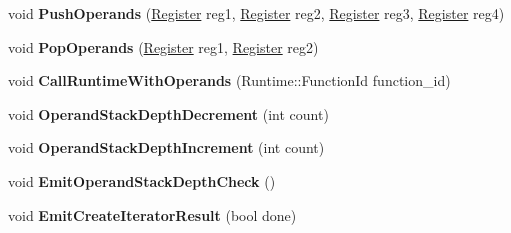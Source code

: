 \begin{DoxyCompactItemize}
\item 
void {\bfseries Push\+Operands} (\hyperlink{structv8_1_1internal_1_1_register}{Register} reg1, \hyperlink{structv8_1_1internal_1_1_register}{Register} reg2, \hyperlink{structv8_1_1internal_1_1_register}{Register} reg3, \hyperlink{structv8_1_1internal_1_1_register}{Register} reg4)\hypertarget{classv8_1_1internal_1_1_full_code_generator_a3cf7e616a0ec471e23ce2690f53fc79c}{}\label{classv8_1_1internal_1_1_full_code_generator_a3cf7e616a0ec471e23ce2690f53fc79c}

\item 
void {\bfseries Pop\+Operands} (\hyperlink{structv8_1_1internal_1_1_register}{Register} reg1, \hyperlink{structv8_1_1internal_1_1_register}{Register} reg2)\hypertarget{classv8_1_1internal_1_1_full_code_generator_ae6779ab4d33886053590c520f7411d66}{}\label{classv8_1_1internal_1_1_full_code_generator_ae6779ab4d33886053590c520f7411d66}

\item 
void {\bfseries Call\+Runtime\+With\+Operands} (Runtime\+::\+Function\+Id function\+\_\+id)\hypertarget{classv8_1_1internal_1_1_full_code_generator_a37a249ad60ca6c20501c6dfc11d990fd}{}\label{classv8_1_1internal_1_1_full_code_generator_a37a249ad60ca6c20501c6dfc11d990fd}

\item 
void {\bfseries Operand\+Stack\+Depth\+Decrement} (int count)\hypertarget{classv8_1_1internal_1_1_full_code_generator_a5388e99be188326b4bb37d6ffa8061d2}{}\label{classv8_1_1internal_1_1_full_code_generator_a5388e99be188326b4bb37d6ffa8061d2}

\item 
void {\bfseries Operand\+Stack\+Depth\+Increment} (int count)\hypertarget{classv8_1_1internal_1_1_full_code_generator_a10d2fb7451cfe8e43ef87415da49a57f}{}\label{classv8_1_1internal_1_1_full_code_generator_a10d2fb7451cfe8e43ef87415da49a57f}

\item 
void {\bfseries Emit\+Operand\+Stack\+Depth\+Check} ()\hypertarget{classv8_1_1internal_1_1_full_code_generator_a2733e89c7ef46d74f9e5581c8ccfb7f6}{}\label{classv8_1_1internal_1_1_full_code_generator_a2733e89c7ef46d74f9e5581c8ccfb7f6}

\item 
void {\bfseries Emit\+Create\+Iterator\+Result} (bool done)\hypertarget{classv8_1_1internal_1_1_full_code_generator_ab1ca24fe0cc67d8f796b0b21a1fce802}{}\label{classv8_1_1internal_1_1_full_code_generator_ab1ca24fe0cc67d8f796b0b21a1fce802}


\end{DoxyCompactItemize}
